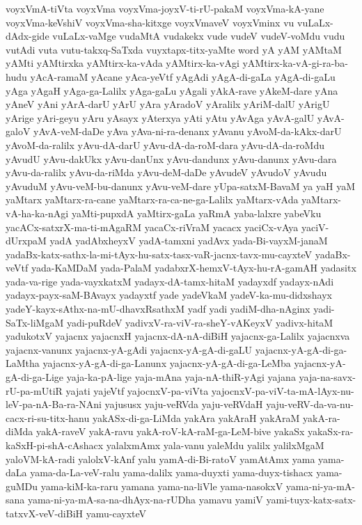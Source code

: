 {voyxVmA-tiVta
voyxVma
voyxVma-joyxV-ti-rU-pakaM
voyxVma-kA-yane
voyxVma-keVshiV
voyxVma-sha-kitxge
voyxVmaveV
voyxVminx
vu
vuLaLx-dAdx-gide
vuLaLx-vaMge
vudaMtA
vudakekx
vude
vudeV
vudeV-voMdu
vudu
vutAdi
vuta
vutu-takxq-SaTxda
vuyxtapx-titx-yaMte
word
yA
yAM
yAMtaM
yAMti
yAMtirxka
yAMtirx-ka-vAda
yAMtirx-ka-vAgi
yAMtirx-ka-vA-gi-ra-ba-hudu
yAcA-ramaM
yAcane
yAca-yeVtf
yAgAdi
yAgA-di-gaLa
yAgA-di-gaLu
yAga
yAgaH
yAga-ga-Lalilx
yAga-gaLu
yAgali
yAkA-rave
yAkeM-dare
yAna
yAneV
yAni
yArA-darU
yArU
yAra
yAradoV
yAralilx
yAriM-dalU
yArigU
yArige
yAri-geyu
yAru
yAsayx
yAterxya
yAti
yAtu
yAvAga
yAvA-galU
yAvA-galoV
yAvA-veM-daDe
yAva
yAva-ni-ra-denanx
yAvanu
yAvoM-da-kAkx-darU
yAvoM-da-ralilx
yAvu-dA-darU
yAvu-dA-da-roM-dara
yAvu-dA-da-roMdu
yAvudU
yAvu-dakUkx
yAvu-danUnx
yAvu-dandunx
yAvu-danunx
yAvu-dara
yAvu-da-ralilx
yAvu-da-riMda
yAvu-deM-daDe
yAvudeV
yAvudoV
yAvudu
yAvuduM
yAvu-veM-bu-danunx
yAvu-veM-dare
yUpa-satxM-BavaM
ya
yaH
yaM
yaMtarx
yaMtarx-ra-cane
yaMtarx-ra-ca-ne-ga-Lalilx
yaMtarx-vAda
yaMtarx-vA-ha-ka-nAgi
yaMti-pupxdA
yaMtirx-gaLa
yaRmA
yaba-lalxre
yabeVku
yacACx-satxrX-ma-ti-mAgaRM
yacaCx-riVraM
yacacx
yaciCx-vAya
yaciV-dUrxpaM
yadA
yadAbxheyxV
yadA-tamxni
yadAvx
yada-Bi-vayxM-janaM
yadaBx-katx-sathx-la-mi-tAyx-hu-satx-tasx-vaR-jacnx-tavx-mu-cayxteV
yadaBx-veVtf
yada-KaMDaM
yada-PalaM
yadabxrX-hemxV-tAyx-hu-rA-gamAH
yadasitx
yada-va-rige
yada-vayxkatxM
yadayx-dA-tamx-hitaM
yadayxdf
yadayx-nAdi
yadayx-payx-saM-BAvayx
yadayxtf
yade
yadeVkaM
yadeV-ka-mu-didxshayx
yadeY-kayx-sAthx-na-mU-dhavxRsathxM
yadf
yadi
yadiM-dha-nAginx
yadi-SaTx-liMgaM
yadi-puRdeV
yadivxV-ra-viV-ra-sheY-vAKeyxV
yadivx-hitaM
yadukotxV
yajacnx
yajacnxH
yajacnx-dA-nA-diBiH
yajacnx-ga-Lalilx
yajacnxva
yajacnx-vanunx
yajacnx-yA-gAdi
yajacnx-yA-gA-di-gaLU
yajacnx-yA-gA-di-ga-LaMtha
yajacnx-yA-gA-di-ga-Lanunx
yajacnx-yA-gA-di-ga-LeMba
yajacnx-yA-gA-di-ga-Lige
yaja-ka-pA-lige
yaja-mAna
yaja-nA-thiR-yAgi
yajana
yaja-na-savx-rU-pa-mUtiR
yajati
yajeVtf
yajocnxV-pa-viVta
yajocnxV-pa-viV-ta-mA-lAyx-nu-leV-pa-nA-Ba-ra-NAni
yajususx
yaju-veRVda
yaju-veRVdaH
yaju-veRV-da-va-nu-cacx-ri-su-titx-hanu
yakASx-di-ga-LiMda
yakAra
yakAraH
yakAraM
yakA-ra-diMda
yakA-raveV
yakA-ravu
yakA-roV-kA-raM-ga-LeM-bive
yakaSx
yakaSx-ra-kaSxH-pi-shA-cAshacx
yalalxmAmx
yala-vanu
yaleMdu
yalilx
yalilxMgaM
yaloVM-kA-radi
yalolxV-kAnf
yalu
yamA-di-Bi-ratoV
yamAtAmx
yama
yama-daLa
yama-da-La-veV-ralu
yama-dalilx
yama-duyxti
yama-duyx-tishacx
yama-guMDu
yama-kiM-ka-raru
yamana
yama-na-liVle
yama-nasokxV
yama-ni-ya-mA-sana
yama-ni-ya-mA-sa-na-dhAyx-na-rUDha
yamavu
yamiV
yami-tuyx-katx-satx-tatxvX-veV-diBiH
yamu-cayxteV
}
